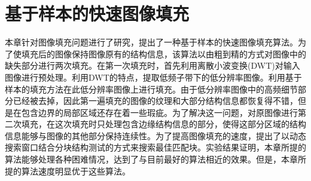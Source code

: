 \chapter{基于样本的快速图像填充}
\label{cha:Inpainting}
本章针对图像填充问题进行了研究，提出了一种基于样本的快速图像填充算法。为了使填充后的图像保持图像原有的结构信息，该算法以由粗到精的方式对图像中的缺失部分进行两次填充。在第一次填充时，首先利用离散小波变换(DWT)对输入图像进行预处理。利用DWT的特点，提取低频子带下的低分辨率图像。利用基于样本的填充方法在此低分辨率图像上进行填充。由于低分辨率图像中的高频细节部分已经被去掉，因此第一遍填充的图像的纹理和大部分结构信息都恢复得不错，但是在包含边界的局部区域还存在着一些瑕疵。为了解决这一问题，对原图像进行第二次填充，在这次填充时只处理包含边缘结构信息的部分，使得这部分区域的结构信息能够与图像的其他部分保持连续性。为了提高图像填充的速度，提出了以动态搜索窗口结合分块结构测试的方式来搜索最佳匹配块。实验结果证明，本章所提的算法能够处理各种困难情况，达到了与目前最好的算法相近的效果。但是，本章所提的算法速度明显优于这些算法。
